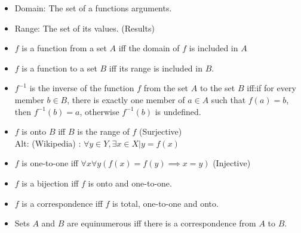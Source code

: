 \begin{itemize}
\begin{itemize}
\end{itemize}

\item Domain: The set of a functions arguments. 
\item Range: The set of its values. (Results) 
\item $f$ is a function from a set $A$ iff the domain of $f$ is included in $A$ 

\item $f$ is a function to a set $B$ iff its range is included in $B$. 

\item $f^{-1}$ is the inverse of the function $f$ from the set $A$ to the set $B$ iff:if for every member $b \in B$, there is exactly one member of $a \in A$ such that $f(a)=b$, then $f^{-1}(b)=a$, otherwise $f^{-1}(b)$ is undefined.

\item $f$ is onto $B$ iff $B$ is the range of $f$ (Surjective) \\ 
Alt: (Wikipedia) : $\forall y \in Y, \exists x \in X | y=f(x)$
\item $f$ is one-to-one iff $\forall x \forall y (f(x)=f(y)\implies x=y)$ (Injective)
\item $f$ is a bijection iff $f$ is onto and one-to-one.
\item $f$ is a correspondence iff $f$ is total, one-to-one and onto.
\item Sets $A$ and $B$ are equinumerous iff there is a correspondence from $A$ to $B$.%
\end{itemize}


